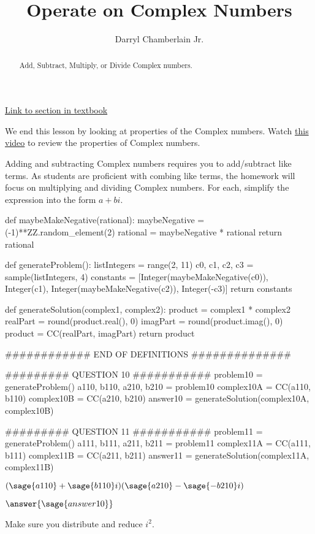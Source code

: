 \documentclass{ximera}
\author{Darryl Chamberlain Jr.}
\title{Operate on Complex Numbers}
\begin{document}
\begin{abstract}
Add, Subtract, Multiply, or Divide Complex numbers. 
\end{abstract}
\maketitle

\href{https://cnx.org/contents/mwjClAV_@8.1:Sqk1HAGf@9/Complex-Numbers}{Link to section in textbook}


We end this lesson by looking at properties of the Complex numbers. Watch \href{https://mediasite.video.ufl.edu/Mediasite/Play/69538629caa6442981b77ebb679edc1e1d}{this video} to review the properties of Complex numbers. 

Adding and subtracting Complex numbers requires you to add/subtract like terms. As students are proficient with combing like terms, the homework will focus on multiplying and dividing Complex numbers. For each, simplify the expression into the form $a+bi$. 

\begin{sagesilent}
def maybeMakeNegative(rational):
    maybeNegative = (-1)**ZZ.random_element(2)
    rational = maybeNegative * rational
    return rational

def generateProblem():
    listIntegers = range(2, 11)
    c0, c1, c2, c3 = sample(listIntegers, 4)
    constants = [Integer(maybeMakeNegative(c0)), Integer(c1), Integer(maybeMakeNegative(c2)), Integer(-c3)]
    return constants

def generateSolution(complex1, complex2):
    product = complex1 * complex2
    realPart = round(product.real(), 0)
    imagPart = round(product.imag(), 0)
    product = CC(realPart, imagPart)
    return product

############ END OF DEFINITIONS ##############

######### QUESTION 10 ###########
problem10 = generateProblem()
a110, b110, a210, b210 = problem10
complex10A = CC(a110, b110)
complex10B = CC(a210, b210)
answer10 = generateSolution(complex10A, complex10B)

######### QUESTION 11 ###########
problem11 = generateProblem()
a111, b111, a211, b211 = problem11
complex11A = CC(a111, b111)
complex11B = CC(a211, b211)
answer11 = generateSolution(complex11A, complex11B)
\end{sagesilent}

\begin{question}
$(\sage{a110}+\sage{b110}i)(\sage{a210}-\sage{-b210}i)$ 

$\answer{\sage{answer10}}$

\begin{hint}
Make sure you distribute and reduce $i^2$. 
\end{hint}
\end{question}
\end{document}
